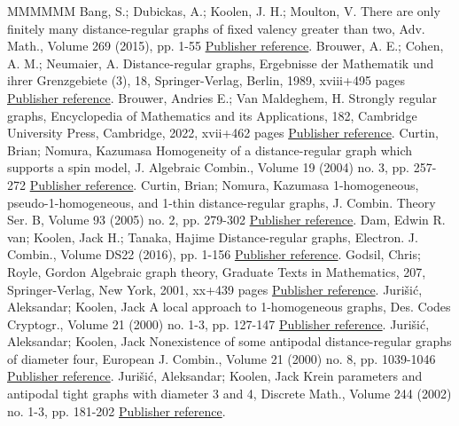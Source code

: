 \begin{thebibliography}{MMMMMM}
 Bang, S.; Dubickas, A.; Koolen, J. H.; Moulton, V. There are only finitely many distance-regular graphs of fixed valency greater than two, Adv. Math., Volume 269 (2015), pp. 1-55 \href{https://alco.centre-mersenne.org/articles/10.5802/alco.454/#BDKM}{Publisher reference}.
 Brouwer, A. E.; Cohen, A. M.; Neumaier, A. Distance-regular graphs, Ergebnisse der Mathematik und ihrer Grenzgebiete (3), 18, Springer-Verlag, Berlin, 1989, xviii+495 pages \href{https://alco.centre-mersenne.org/articles/10.5802/alco.454/#BCN}{Publisher reference}.
 Brouwer, Andries E.; Van Maldeghem, H. Strongly regular graphs, Encyclopedia of Mathematics and its Applications, 182, Cambridge University Press, Cambridge, 2022, xvii+462 pages \href{https://alco.centre-mersenne.org/articles/10.5802/alco.454/#BrVM2022}{Publisher reference}.
 Curtin, Brian; Nomura, Kazumasa Homogeneity of a distance-regular graph which supports a spin model, J. Algebraic Combin., Volume 19 (2004) no. 3, pp. 257-272 \href{https://alco.centre-mersenne.org/articles/10.5802/alco.454/#CurtinNomura2004}{Publisher reference}.
 Curtin, Brian; Nomura, Kazumasa 1-homogeneous, pseudo-1-homogeneous, and 1-thin distance-regular graphs, J. Combin. Theory Ser. B, Volume 93 (2005) no. 2, pp. 279-302 \href{https://alco.centre-mersenne.org/articles/10.5802/alco.454/#CurtinNomura2005}{Publisher reference}.
 Dam, Edwin R. van; Koolen, Jack H.; Tanaka, Hajime Distance-regular graphs, Electron. J. Combin., Volume DS22 (2016), pp. 1-156 \href{https://alco.centre-mersenne.org/articles/10.5802/alco.454/#DaKoTa}{Publisher reference}.
 Godsil, Chris; Royle, Gordon Algebraic graph theory, Graduate Texts in Mathematics, 207, Springer-Verlag, New York, 2001, xx+439 pages \href{https://alco.centre-mersenne.org/articles/10.5802/alco.454/#GR01}{Publisher reference}.
 Jurišić, Aleksandar; Koolen, Jack A local approach to 1-homogeneous graphs, Des. Codes Cryptogr., Volume 21 (2000) no. 1-3, pp. 127-147 \href{https://alco.centre-mersenne.org/articles/10.5802/alco.454/#JK2000-1}{Publisher reference}.
 Jurišić, Aleksandar; Koolen, Jack Nonexistence of some antipodal distance-regular graphs of diameter four, European J. Combin., Volume 21 (2000) no. 8, pp. 1039-1046 \href{https://alco.centre-mersenne.org/articles/10.5802/alco.454/#JK2000-2}{Publisher reference}.
 Jurišić, Aleksandar; Koolen, Jack Krein parameters and antipodal tight graphs with diameter 3 and 4, Discrete Math., Volume 244 (2002) no. 1-3, pp. 181-202 \href{https://alco.centre-mersenne.org/articles/10.5802/alco.454/#JK2002}{Publisher reference}.

\end{thebibliography}
